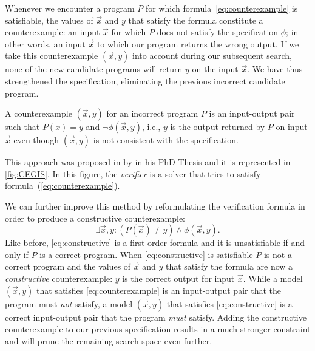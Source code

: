 

Whenever we encounter a program \(P\) for which formula~\eqref{eq:counterexample} is satisfiable, the values of \(\vec{x}\) and \(y\) that satisfy the formula constitute a counterexample: an input \(\vec{x}\) for which \(P\) does not satisfy the specification \(\phi\); in other words, an input \(\vec{x}\) to which our program returns the wrong output.
If we take this counterexample \((\vec{x}, y)\) into account during our subsequent search, none of the new candidate programs will return \(y\) on the input \(\vec{x}\).
We have thus strengthened the specification, eliminating the previous incorrect candidate program.

\begin{definition}[Counterexample]
A counterexample \((\vec{x}, y)\) for an incorrect program \(P\) is an input-output pair such that \(P(x) = y\) and \(\neg \phi(\vec{x}, y)\), i.e., \(y\) is the output returned by \(P\) on input \(\vec{x}\) even though \((\vec{x}, y)\) is not consistent with the specification.
\end{definition}

This approach was proposed in \citeyear{Solar-LezamaPhDThesis} by \citeauthor{Solar-LezamaPhDThesis} in his PhD Thesis \cite{Solar-LezamaPhDThesis} and it is represented in \autoref{fig:CEGIS}. In this figure, the \textit{verifier} is a solver that tries to satisfy formula~(\ref{eq:counterexample}).

We can further improve this method by reformulating the verification formula in order to produce a constructive counterexample:
%
\begin{equation}\label{eq:constructive}
\exists \vec{x}, y : (P(\vec{x}) \neq y) \wedge \phi(\vec{x}, y).
\end{equation}
%
Like before, \eqref{eq:constructive} is a first-order formula and it is unsatisfiable if and only if \(P\) is a correct program.
When \eqref{eq:constructive} is satisfiable \(P\) is not a correct program and the values of \(\vec{x}\) and \(y\) that satisfy the formula are now a \textit{constructive} counterexample: \(y\) is the correct output for input \(\vec{x}\).
While a model \((\vec{x}, y)\) that satisfies \eqref{eq:counterexample} is an input-output pair that the program must \textit{not} satisfy, a model \((\vec{x}, y)\) that satisfies \eqref{eq:constructive} is a correct input-output pair that the program \textit{must} satisfy.
Adding the constructive counterexample to our previous specification results in a much stronger constraint and will prune the remaining search space even further. %

